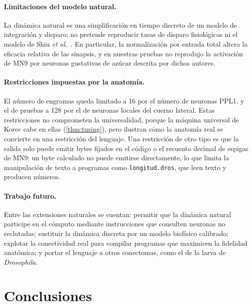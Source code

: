 \documentclass[11pt,a4paper]{article}
\theoremstyle{plain}
\theoremstyle{definition}
\theoremstyle{remark}
\begin{document}
\paragraph{Limitaciones del modelo natural.} La dinámica natural es una
simplificación en tiempo discreto de un modelo de integración y disparo;
no pretende reproducir tasas de disparo fisiológicas ni el modelo de Shiu
\emph{et al.}~\cite{shiu2024}. En particular, la normalización por entrada
total altera la eficacia relativa de las sinapsis, y en nuestras pruebas no
reprodujo la activación de MN9 por neuronas gustativas de azúcar descrita
por dichos autores.

\paragraph{Restricciones impuestas por la anatomía.} El número de engramas
queda limitado a 16 por el número de neuronas PPL1, y el de pruebas a 128 por
el de neuronas locales del cuerno lateral. Estas restricciones no comprometen
la universalidad, porque la máquina universal de Korec cabe en ellas
(\cref{thm:turing}), pero ilustran cómo la anatomía real se convierte en una
restricción del lenguaje. Una restricción de otro tipo es que la salida solo
puede emitir bytes fijados en el código o el recuento decimal de espigas de
MN9: un byte calculado no puede emitirse directamente, lo que limita la
manipulación de texto a programas como \texttt{longitud.dros}, que leen texto
y producen números.

\paragraph{Trabajo futuro.} Entre las extensiones naturales se cuentan:
permitir que la dinámica natural participe en el cómputo mediante
instrucciones que consulten neuronas no reclutadas; sustituir la dinámica
discreta por un modelo biofísico calibrado; explotar la conectividad real
para compilar programas que maximicen la fidelidad anatómica; y portar el
lenguaje a otros conectomas, como el de la larva de \textit{Drosophila}.

\section{Conclusiones}
\label{sec:conclusiones}
\end{document}
